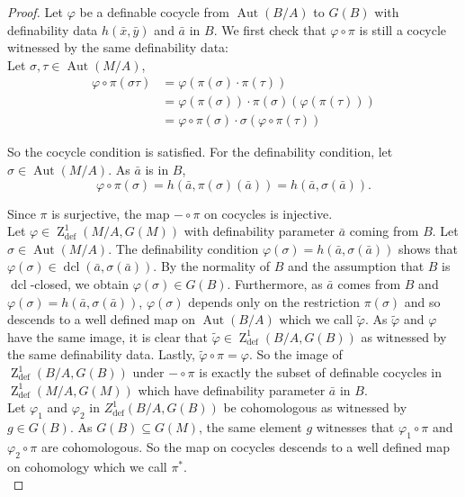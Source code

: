 \documentclass{article}
\theoremstyle{problemstyle}
\DeclareMathOperator{\defin}{def} %
\DeclareMathOperator{\aut}{Aut} %
\DeclareMathOperator{\ZZ}{Z} %
\DeclareMathOperator{\dcl}{dcl} %
\begin{document}
\begin{proof}
Let $\varphi$ be a definable cocycle from $\aut(B/A)$ to $G(B)$ with definability data $h(\bar{x},\bar{y})$ and $\bar{a}$ in $B$. We first check that $\varphi \circ \pi$ is still a cocycle witnessed by the same definability data:\\

Let $\sigma, \tau \in \aut(M/A)$, 
\begin{align*}
    \varphi \circ \pi(\sigma\tau) &= \varphi(\pi(\sigma)\cdot \pi(\tau))\\
    &= \varphi(\pi(\sigma))\cdot \pi(\sigma)(\varphi(\pi(\tau)))\\
    &= \varphi\circ \pi(\sigma)\cdot \sigma(\varphi\circ \pi(\tau))
\end{align*}

So the cocycle condition is satisfied. For the definability condition, let $\sigma \in \aut(M/A)$. As $\bar{a}$ is in $B$, $$\varphi\circ \pi(\sigma) = h(\bar{a},\pi(\sigma)(\bar{a})) = h(
\bar{a},\sigma(\bar{a})).$$

Since $\pi$ is surjective, the map $-\circ \pi$ on cocycles is injective.\\

Let $\varphi \in \ZZ^1_{\defin}(M/A,G(M))$ with definability parameter $\bar{a}$ coming from $B$. Let $\sigma \in \aut(M/A)$. The definability condition $\varphi(\sigma) = h(\bar{a},\sigma(\bar{a}))$ shows that $\varphi(\sigma) \in \dcl(\bar{a}, \sigma(\bar{a}))$. By the normality of $B$ and the assumption that $B$ is $\dcl$-closed, we obtain $\varphi(\sigma) \in G(B)$. Furthermore, as $\bar{a}$ comes from $B$ and $\varphi(\sigma) = h(\bar{a},\sigma(\bar{a}))$, $\varphi(\sigma)$ depends only on the restriction $\pi(\sigma)$ and so descends to a well defined map on $\aut(B/A)$ which we call $\tilde{\varphi}$. As $\tilde{\varphi}$ and $\varphi$ have the same image, it is clear that $\tilde{\varphi} \in \ZZ^1_{\defin}(B/A,G(B))$ as witnessed by the same definability data. Lastly, $\tilde{\varphi}\circ \pi = \varphi$. So the image of $\ZZ^1_{\defin}(B/A,G(B))$ under $-\circ\pi$ is exactly the subset of definable cocycles in $\ZZ^1_{\defin}(M/A,G(M))$ which have definability parameter $\bar{a}$ in $B$.\\

Let $\varphi_1$ and $\varphi_2$ in  $Z^1_{\defin}(B/A,G(B))$ be cohomologous as witnessed by $g \in G(B)$. As $G(B) \subseteq G(M)$, the same element $g$ witnesses that $\varphi_1 \circ \pi$ and $\varphi_2 \circ \pi$ are cohomologous. So the map on cocycles descends to a well defined map on cohomology which we call $\pi^*$.\\


\end{proof}
\end{document}
